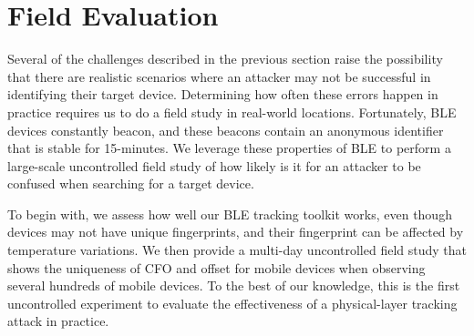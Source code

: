 \section{Field Evaluation}
\label{sec:results}




Several of the challenges described in the previous section raise the
possibility that there are realistic scenarios where an attacker may not be successful in identifying their target device. 
%
Determining
how often these errors happen in practice requires us to do a field study in real-world locations. 
%
Fortunately,
BLE devices constantly beacon, and these beacons contain an anonymous identifier that is stable for 15-minutes. 
%
We leverage these properties of BLE to perform a
large-scale uncontrolled field study of how likely is it for an attacker to be confused when searching for a target device.

To begin with, we assess how well our BLE tracking toolkit works, even though devices
may not have unique fingerprints, and their fingerprint can be affected by
temperature variations.
%
We then provide a multi-day uncontrolled field study that shows the uniqueness of CFO and \iq offset for mobile devices when observing several hundreds of mobile devices.
%
To the best of our
knowledge, this is the first uncontrolled experiment to evaluate the
effectiveness of a physical-layer tracking attack in practice.

